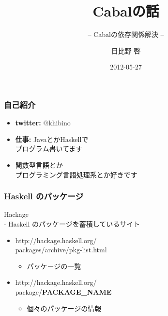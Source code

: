 \documentclass[cjk,dvipdfm,14pt]{beamer}
\title{Cabalの話}
\subtitle{-- Cabalの依存関係解決 --}
\author{日比野 啓}
\date{ 2012-05-27 }
\begin{document}
\begin{frame}
\maketitle
\end{frame}

\begin{frame}
\frametitle{自己紹介}

\begin{itemize}
\item {\bf twitter:} @khibino
\item {\bf 仕事:} JavaとかHaskellで\\プログラム書いてます
\item 関数型言語とか\\プログラミング言語処理系とか好きです
\end{itemize}

\end{frame}









\begin{frame}
\frametitle{Haskell のパッケージ}

Hackage \\- Haskell のパッケージを蓄積しているサイト

\begin{itemize}
\item http://hackage.haskell.org/\\packages/archive/pkg-list.html
  \begin{itemize}
  \item パッケージの一覧
  \end{itemize}
\item http://hackage.haskell.org/\\package/{\bf PACKAGE\_NAME}
  \begin{itemize}
  \item 個々のパッケージの情報
  \end{itemize}
\end{itemize}

\end{frame}
\end{document}
